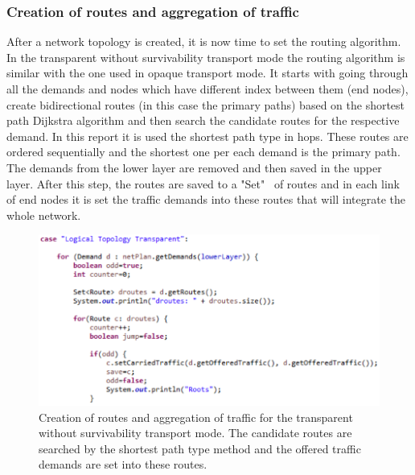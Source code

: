 \subsubsection{Creation of routes and aggregation of traffic}

\vspace{11pt}
After a network topology is created, it is now time to set the routing algorithm. In the transparent without survivability transport mode the routing algorithm is similar with the one used in opaque transport mode. It starts with going through all the demands and nodes which have different index between them (end nodes), create bidirectional routes (in this case the primary paths) based on the shortest path Dijkstra algorithm and then search the candidate routes for the respective demand. In this report it is used the shortest path type in hops. These routes are ordered sequentially and the shortest one per each demand is the primary path. The demands from the lower layer are removed and then saved in the upper layer. After this step, the routes are saved to a "Set" \ of routes and in each link of end nodes it is set the traffic demands into these routes that will integrate the whole network.

\begin{figure}[H]
\centering
\includegraphics[width=14cm]{sdf/heuristic/transparent/figures/grooming_transparent_surv1}
\caption{Creation of routes and aggregation of traffic for the transparent without survivability transport mode. The candidate routes are searched by the shortest path type method and the offered traffic demands are set into these routes.}
\label{grooming_transparent_surv1}
\end{figure}

